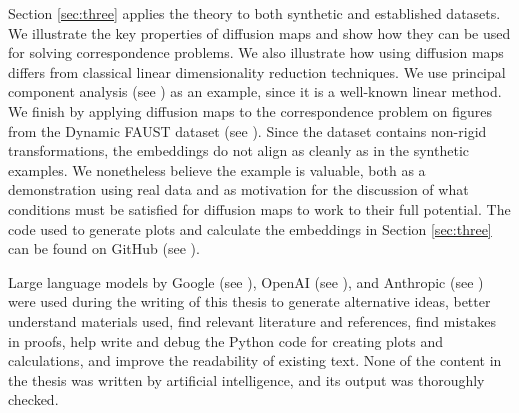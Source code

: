 Section \ref{sec:three} applies the theory to both synthetic and established datasets. We illustrate the key properties of diffusion maps and show how they can be used for solving correspondence problems. We also illustrate how using diffusion maps differs from classical linear dimensionality reduction techniques. We use principal component analysis (see \cite[Section~1.1]{PCA}) as an example, since it is a well-known linear method. We finish by applying diffusion maps to the correspondence problem on figures from the Dynamic FAUST dataset (see \cite{FAUST}). Since the dataset contains non-rigid transformations, the embeddings do not align as cleanly as in the synthetic examples. We nonetheless believe the example is valuable, both as a demonstration using real data and as motivation for the discussion of what conditions must be satisfied for diffusion maps to work to their full potential. The code used to generate plots and calculate the embeddings in Section \ref{sec:three} can be found on GitHub (see \cite{git}). 

Large language models by Google (see \cite{gemini}), OpenAI (see \cite{gpt}), and Anthropic (see \cite{claude}) were used during the writing of this thesis to generate alternative ideas, better understand materials used, find relevant literature and references, find mistakes in proofs, help write and debug the Python code for creating plots and calculations, and improve the readability of existing text. None of the content in the thesis was written by artificial intelligence, and its output was thoroughly checked.